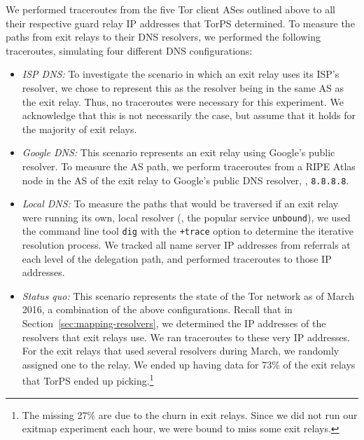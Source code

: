 We performed traceroutes from the five Tor client ASes outlined above to all
their respective guard relay IP addresses that TorPS determined.  To measure the
paths from exit relays to their DNS resolvers, we performed the following
traceroutes, simulating four different DNS configurations:
\begin{itemize}
	\item \emph{ISP DNS:} To investigate the scenario in which an exit relay
		uses its ISP's resolver, we chose to represent this as the resolver
		being in the same AS as the exit relay.  Thus, no traceroutes were
		necessary for this experiment.  We acknowledge that this is not
		necessarily the case, but assume that it holds for the majority of exit
		relays.

	\item \emph{Google DNS:} This scenario represents an exit relay using
		Google's public resolver.  To measure the AS path, we perform
		traceroutes from a RIPE Atlas node in the AS of the exit relay to
		Google's public DNS resolver, \ie, {\tt 8.8.8.8}.

	\item \emph{Local DNS:} To measure the paths that would be traversed if an
		exit relay were running its own, local resolver (\eg, the popular
		service {\tt unbound}), we used the command line tool {\tt dig} with the
		{\tt +trace} option to determine the iterative resolution process.  We
		tracked all name server IP addresses from referrals at each level of the
		delegation path, and performed traceroutes to those IP addresses.

	\item \emph{Status quo:} This scenario represents the state of the Tor
		network as of March 2016, a combination of the above configurations.
		Recall that in Section~\ref{sec:mapping-resolvers}, we determined
		the IP addresses of the resolvers that exit relays use.  We ran
		traceroutes to these very IP addresses.  For the exit relays that used
		several resolvers during March, we randomly assigned one to the relay.
		We ended up having data for 73\% of the exit relays that TorPS ended up
		picking.\footnote{The missing 27\% are due to the churn in exit relays.
		Since we did not run our exitmap experiment each hour, we were bound to
		miss some exit relays.}
\end{itemize}

